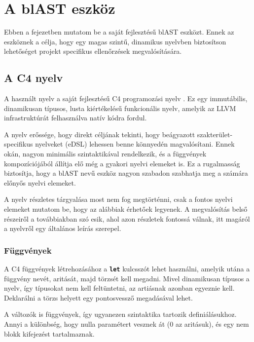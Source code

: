 \chapter{A blAST eszköz}

Ebben a fejezetben mutatom be a saját fejlesztésű blAST eszközt.
Ennek az eszköznek a célja, hogy egy magas szintű, dinamikus nyelvben biztosítson lehetőséget projekt specifikus ellenőrzések megvalósítására.

\section{A C4 nyelv}

A használt nyelv a saját fejlesztésű C4 programozási nyelv \cite{bodorAltalanosCeluProgramnyelv2025}.
Ez egy immutábilis, dinamikusan típusos, lusta kiértékelésű funkcionális nyelv, amelyik az LLVM infrastruktúrát felhasználva natív kódra fordul.

A nyelv erőssége, hogy direkt céljának tekinti, hogy beágyazott szakterület-specifikus nyelveket (\gls{eDSL}) lehessen benne könnyedén magvalósítani.
Ennek okán, nagyon minimális szintaktikával rendelkezik, és a függvények kompozíciójából állítja elő még a gyakori nyelvi elemeket is.
Ez a rugalmasság biztosítja, hogy a blAST nevű eszköz nagyon szabadon szabhatja meg a számára előnyős nyelvi elemeket.

A nyelv részletes tárgyalása most nem fog megtörténni, csak a fontos nyelvi elemeket mutatom be, hogy az alábbiak érhetőek legyenek.
A megvalósítás belső részeiről a továbbiakban szó esik, ahol azon részletek fontossá válnak, itt magáról a nyelvről egy általános leírás szerepel.

\subsection*{Függvények}

A C4 függvények létrehozásához a {\tt\bf let} kulcsszót lehet használni, amelyik utána a függvény nevét, aritását, majd törzsét kell megadni.
Mivel dinamikusan típusos a nyelv, így típusokat nem kell feltüntetni, az artiásnak azonban egyeznie kell.
Deklarálni a törzs helyett egy pontosvessző megadásával lehet.

A változók is függvények, így ugyanezen szintaktika tartozik definiálásukhoz.
Annyi a különbség, hogy nulla paramétert vesznek át (0 az aritásuk), és egy nem blokk kifejezést tartalmaznak.

